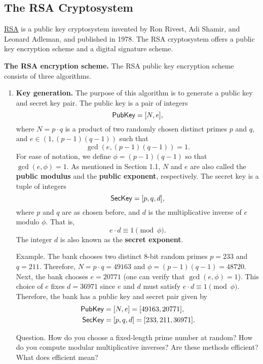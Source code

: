 \subsection{The RSA Cryptosystem}

\href{https://en.wikipedia.org/wiki/RSA_(cryptosystem)}{RSA} is a public key cryptosystem invented by Ron Rivest, Adi Shamir, and Leonard Adleman, and published in 1978. The RSA cryptosystem offers a public key encryption scheme and a digital signature scheme.

{\bf The RSA encryption scheme.} The RSA public key encryption scheme consists of three algorithms.
\begin{enumerate}
    \item {\bf Key generation.} The purpose of this algorithm is to generate a public key and secret key pair. The public key is a pair of integers
    \[ {\sf PubKey} = [N, e], \]
    where $N = p\cdot q$ is a product of two randomly chosen distinct primes $p$ and $q$, and 
    $e \in (1, (p-1)(q-1))$ such that
    \[ \gcd(e, (p-1)(q-1)) = 1. \]
    For ease of notation, we define $\phi = (p-1)(q-1)$ so that $\gcd(e, \phi) = 1$. As mentioned in 
    Section 1.1, $N$ and $e$ are also called the {\bf public modulus} and the {\bf public 
    exponent}, respectively. The secret key is a tuple of integers 
    \[ {\sf SecKey} = [p, q, d], \]
    where $p$ and $q$ are as chosen before, and $d$ is the multiplicative inverse of 
    $e$ modulo $\phi$. That is, 
    \[ e \cdot d \equiv 1 \pmod \phi. \]
    The integer $d$ is also known as the {\bf secret exponent}.
    
    \newpage
    {\sc Example.} The bank chooses two distinct 8-bit random primes $p = 233$ and $q = 211$. 
    Therefore, $N = p \cdot q = 49163$ and $\phi = (p-1)(q-1) = 48720$. Next, the bank 
    chooses $e = 20771$ (one can verify that $\gcd(e, \phi) = 1$). This choice of $e$ fixes 
    $d = 36971$ since $e$ and $d$ must satisfy $e \cdot d \equiv 1 \pmod \phi$. Therefore, the bank has 
    a public key and secret pair given by 
    \begin{align*}
        {\sf PubKey} &= [N, e] = [49163, 20771], \\
        {\sf SecKey} &= [p, q, d] = [233, 211, 36971].
    \end{align*}
    
    {\sc Question.} How do you choose a fixed-length prime number at random? How do you compute modular multiplicative inverses? Are these methods efficient? What does efficient mean?
    

\end{enumerate}
